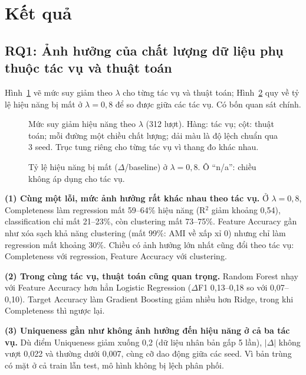 \section{Kết quả}
\label{sec:ket-qua}

\subsection{RQ1: Ảnh hưởng của chất lượng dữ liệu phụ thuộc tác vụ và thuật toán}
\label{sec:rq1}

Hình~\ref{fig:h3} vẽ mức suy giảm theo $\lambda$ cho từng tác vụ và thuật toán; Hình~\ref{fig:h4} quy về tỷ lệ hiệu năng bị mất ở $\lambda = 0{,}8$ để so được giữa các tác vụ. Có bốn quan sát chính.

\begin{figure}[htbp]
\centering
{}
\caption{Mức suy giảm hiệu năng theo $\lambda$ (312 lượt). Hàng: tác vụ; cột: thuật toán; mỗi đường một chiều chất lượng; dải màu là độ lệch chuẩn qua 3 seed. Trục tung riêng cho từng tác vụ vì thang đo khác nhau.}
\label{fig:h3}
\end{figure}

\begin{figure}[ht]
\centering
{}
\caption{Tỷ lệ hiệu năng bị mất ($\Delta$/baseline) ở $\lambda = 0{,}8$. Ô ``n/a'': chiều không áp dụng cho tác vụ.}
\label{fig:h4}
\end{figure}

\textbf{(1) Cùng một lỗi, mức ảnh hưởng rất khác nhau theo tác vụ.} Ở $\lambda = 0{,}8$, Completeness làm regression mất 59--64\% hiệu năng (R$^2$ giảm khoảng 0,54), classification chỉ mất 21--23\%, còn clustering mất 73--75\%. Feature Accuracy gần như xóa sạch khả năng clustering (mất 99\%: AMI về xấp xỉ 0) nhưng chỉ làm regression mất khoảng 30\%. Chiều có ảnh hưởng lớn nhất cũng đổi theo tác vụ: Completeness với regression, Feature Accuracy với clustering.

\textbf{(2) Trong cùng tác vụ, thuật toán cũng quan trọng.} Random Forest nhạy với Feature Accuracy hơn hẳn Logistic Regression ($\Delta$F1 0,13--0,18 so với 0,07--0,10). Target Accuracy làm Gradient Boosting giảm nhiều hơn Ridge, trong khi Completeness thì ngược lại.

\textbf{(3) Uniqueness gần như không ảnh hưởng đến hiệu năng ở cả ba tác vụ.} Dù điểm Uniqueness giảm xuống 0,2 (dữ liệu nhân bản gấp 5 lần), $|\Delta|$ không vượt 0,022 và thường dưới 0,007, cùng cỡ dao động giữa các seed. Vì bản trùng có mặt ở cả train lẫn test, mô hình không bị lệch phân phối.

